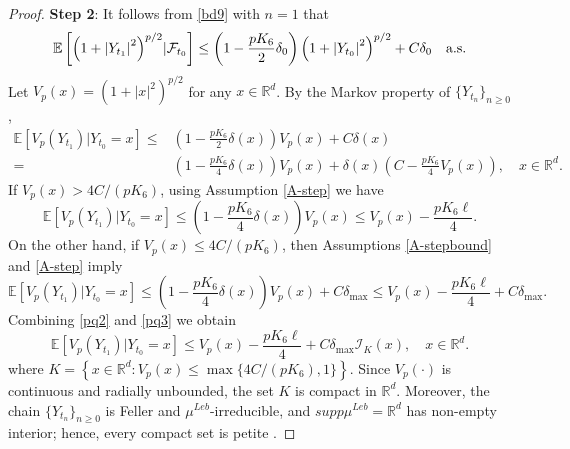 \documentclass[preprint,12pt,compress]{elsarticle}
\begin{document}
\begin{proof}
\textbf{Step 2}:
It follows from \eqref{bd9} with $n = 1$ that
\begin{equation*}  
	\begin{split}
		\mathbb{E}\left[ {{\left( {1 + {{\left| {{Y_{{t_{ 1}}}}} \right|}^2}} \right)^{p/2}}|{{\cal F}_{{t_0}}}} \right] 
		\le \left( {1 - \frac{{p{K_6}}}{2}{\delta _0}} \right){\left( {1 + {{\left| {{Y_{{t_0}}}} \right|}^2}} \right)^{p/2}} + C{\delta _0}  \quad \text{a.s.}
	\end{split}
\end{equation*} 
Let $V_p(x) = {\left( {1 + {{\left| x \right|}^2}} \right)^{p/2}}$ for any $x \in \mathbb{R}^d$. By the Markov property of ${\{ {Y_{{t_n}}}\} _{n \ge 0}}$, 
\begin{equation*}
	\begin{split}
		\mathbb{E}\left[ {V_p({Y_{{t_{1}}}})|{Y_{{t_0}}} = x} \right] \le& \left( {1 - \frac{pK_6}{2} \delta (x)} \right)V_p(x) + C\delta (x) \\
		=& \left( {1 - \frac{{pK_6 }}{4}}\delta (x) \right)V_p(x) + \delta (x)\left( {C - \frac{pK_6 }{4}V_p(x)} \right), \quad  x \in \mathbb{R}^d.
	\end{split}
\end{equation*}
If $V_p(x) > 4C/(pK_6) $, using Assumption \ref{A-step} we have
\begin{equation} 	\label{pq2}
	\mathbb{E}\left[ {V_p({Y_{{t_{ 1}}}})|{Y_{{t_0}}} = x} \right] \le \left( {1 - \frac{{pK_6 }}{4}}\delta (x) \right)V_p(x) \le V_p (x) - \frac{pK_6\ell}{4}.
\end{equation}
On the other hand, if $V_p(x) \le 4C/(pK_6) $, then Assumptions \ref{A-stepbound} and \ref{A-step} imply
\begin{equation}	\label{pq3}
	\mathbb{E}\left[ {V_p({Y_{{t_{ 1}}}})|{Y_{{t_0}}} = x} \right] \le \left( {1 - \frac{{pK_6 }}{4}} \delta (x) \right)V_p(x) + C{\delta _{\max }} \le V_p (x) - \frac{pK_6\ell}{4} + C\delta_{\max}.
\end{equation}
Combining \eqref{pq2} and \eqref{pq3} we obtain
\begin{equation}  \label{pq5}
	\mathbb{E}\left[ {V_p({Y_{{t_{ 1}}}})|{Y_{{t_0}}} = x} \right] \le V_p(x) - \frac{pK_6\ell}{4} + C{\delta _{\max }}{\mathcal{I}_K}(x), \quad x\in \mathbb{R}^d.
\end{equation}
where $K = \left\{ {x \in {\mathbb{R}^d}:V_p(x) \le \max \{ 4C/(pK_6), 1\} } \right\}$. Since $V_p(\cdot)$ is continuous and radially unbounded, the set $K$ is compact in $\mathbb{R}^d$.
Moreover, the chain ${\{ {Y_{{t_n}}}\} _{n \ge 0}}$ is Feller  and $\mu^{Leb}$-irreducible, and $supp \mu^{Leb} = \mathbb{R}^d$ has non-empty interior; hence, every compact set is petite \cite[Proposition 6.2.8, p. 133]{meyn2009markov}. 

\end{proof}
\end{document}
